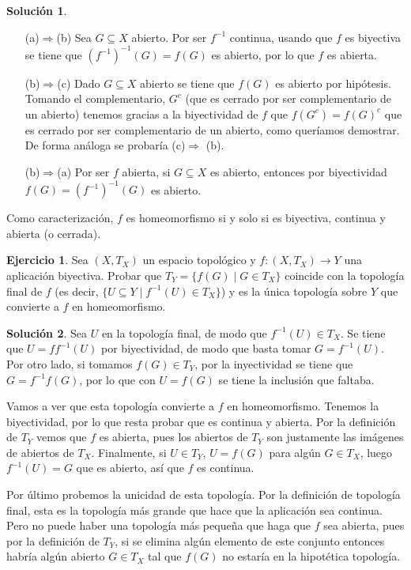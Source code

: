 \documentclass{article}
\theoremstyle{plain}
\theoremstyle{definition}
\newtheorem{exercise}{Ejercicio}
\newtheorem*{sol*}{Solución}
\begin{document}
\begin{sol*}\
\begin{itemize}
\item[(a)$\Rightarrow$(b)] Sea $G\subseteq X$ abierto. Por ser $f^{-1}$ continua, usando que $f$ es biyectiva se tiene que $(f^{-1})^{-1}(G)=f(G)$ es abierto, por lo que $f$ es abierta.
\item[(b)$\Rightarrow$(c)] Dado $G\subseteq X$ abierto se tiene que $f(G)$ es abierto por hipótesis. Tomando el complementario, $G^c$ (que es cerrado por ser complementario de un abierto) tenemos gracias a la biyectividad de $f$ que $f(G^c)=f(G)^c$ que es cerrado por ser complementario de un abierto, como queríamos demostrar. De forma análoga se probaría (c)$\Rightarrow$ (b).
\item[(b)$\Rightarrow$(a)] Por ser $f$ abierta, si $G\subseteq X$ es abierto, entonces por biyectividad $f(G)=(f^{-1})^{-1}(G)$ es abierto. 
\end{itemize}
Como caracterización, $f$ es homeomorfismo si y solo si es biyectiva, continua y abierta (o cerrada). 
\end{sol*}

\begin{exercise}
Sea $(X,T_X)$ un espacio topológico y $f:(X,T_X)\longrightarrow Y$ una aplicación biyectiva. Probar que $T_Y=\{f(G)\mid G\in T_X\}$ coincide con la topología final de $f$ (es decir, $\{U\subseteq Y\mid f^{-1}(U)\in T_X\}$) y es la única topología sobre $Y$ que convierte a $f$ en homeomorfismo.
\end{exercise}

\begin{sol*}
Sea $U$ en la topología final, de modo que $f^{-1}(U)\in T_X$. Se tiene que $U=ff^{-1}(U)$ por biyectividad, de modo que basta tomar $G=f^{-1}(U)$. Por otro lado, si tomamos $f(G)\in T_Y$, por la inyectividad se tiene que $G=f^{-1}f(G)$, por lo que con $U=f(G)$ se tiene la inclusión que faltaba.

Vamos a ver que esta topología convierte a $f$ en homeomorfismo. Tenemos la biyectividad, por lo que resta probar que es continua y abierta. Por la definición de $T_Y$ vemos que $f$ es abierta, pues los abiertos de $T_Y$ son justamente las imágenes de abiertos de $T_X$. Finalmente, si $U\in T_Y$, $U=f(G)$ para algún $G\in T_X$, luego $f^{-1}(U)=G$ que es abierto, así que $f$ es continua.

Por último probemos la unicidad de esta topología. Por la definición de topología final, esta es la topología más grande que hace que la aplicación sea continua. Pero no puede haber una topología más pequeña que haga que $f$ sea abierta, pues por la definición de $T_Y$, si se elimina algún elemento de este conjunto entonces habría algún abierto $G\in T_X$ tal que $f(G)$ no estaría en la hipotética topología. 
\end{sol*}
\end{document}
